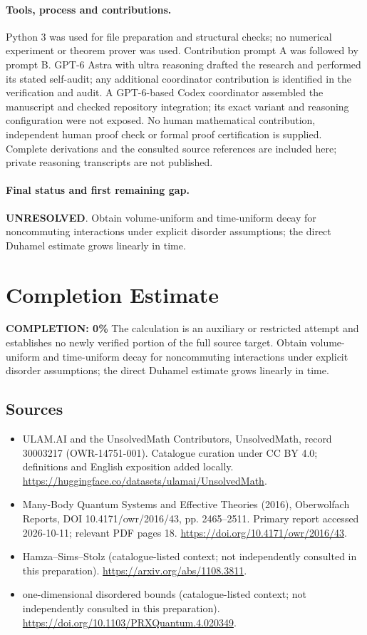 \documentclass[11pt]{article}
\begin{document}
\paragraph{Tools, process and contributions.}
Python 3 was used for file preparation and structural checks; no numerical experiment or theorem prover was used. Contribution prompt A was followed by prompt B. GPT-6 Astra with ultra reasoning drafted the research and performed its stated self-audit; any additional coordinator contribution is identified in the verification and audit. A GPT-6-based Codex coordinator assembled the manuscript and checked repository integration; its exact variant and reasoning configuration were not exposed. No human mathematical contribution, independent human proof check or formal proof certification is supplied. Complete derivations and the consulted source references are included here; private reasoning transcripts are not published.

\paragraph{Final status and first remaining gap.}
\textbf{UNRESOLVED}. Obtain volume-uniform and time-uniform decay for noncommuting interactions under explicit disorder assumptions; the direct Duhamel estimate grows linearly in time.

\section{Completion Estimate}
\noindent\textbf{COMPLETION: 0\%}
The calculation is an auxiliary or restricted attempt and establishes no newly verified portion of the full source target. Obtain volume-uniform and time-uniform decay for noncommuting interactions under explicit disorder assumptions; the direct Duhamel estimate grows linearly in time.

\subsection{Sources}
\begin{itemize}
\item[\hypertarget{source:30003217:1}{S1}] ULAM.AI and the UnsolvedMath Contributors, UnsolvedMath, record 30003217 (OWR-14751-001). Catalogue curation under CC BY 4.0; definitions and English exposition added locally.
\url{https://huggingface.co/datasets/ulamai/UnsolvedMath}.
\item[\hypertarget{source:30003217:2}{S2}] Many-Body Quantum Systems and Effective Theories (2016), Oberwolfach Reports, DOI 10.4171/owr/2016/43, pp. 2465--2511. Primary report accessed 2026-10-11; relevant PDF pages 18.
\url{https://doi.org/10.4171/owr/2016/43}.
\item[\hypertarget{source:30003217:3}{S3}] Hamza--Sims--Stolz (catalogue-listed context; not independently consulted in this preparation).
\url{https://arxiv.org/abs/1108.3811}.
\item[\hypertarget{source:30003217:4}{S4}] one-dimensional disordered bounds (catalogue-listed context; not independently consulted in this preparation).
\url{https://doi.org/10.1103/PRXQuantum.4.020349}.
\end{itemize}
\label{end:30003217}
\end{document}
